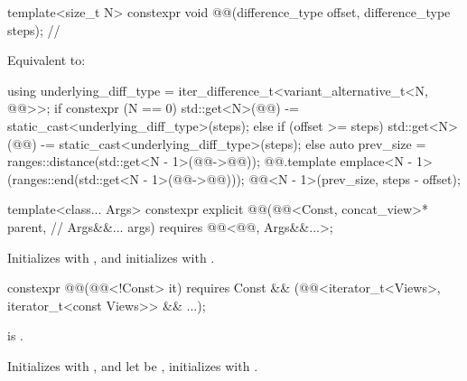 %
\begin{itemdecl}
template<size_t N>
  constexpr void @@(difference_type offset, difference_type steps);        // \expos
\end{itemdecl}

\begin{itemdescr}
\pnum
\effects
Equivalent to:
\begin{codeblock}
using underlying_diff_type = iter_difference_t<variant_alternative_t<N, @@>>;
if constexpr (N == 0) {
  std::get<N>(@@) -= static_cast<underlying_diff_type>(steps);
} else {
  if (offset >= steps) {
    std::get<N>(@@) -= static_cast<underlying_diff_type>(steps);
  } else {
    auto prev_size = ranges::distance(std::get<N - 1>(@@->@@));
    @@.template emplace<N - 1>(ranges::end(std::get<N - 1>(@@->@@)));
    @@<N - 1>(prev_size, steps - offset);
  }
}
\end{codeblock}
\end{itemdescr}

%
\begin{itemdecl}
template<class... Args>
  constexpr explicit @@(@@<Const, concat_view>* parent,          // \expos
                              Args&&... args)
    requires @@<@@, Args&&...>;
\end{itemdecl}

\begin{itemdescr}
\pnum
\effects
Initializes  with , and
initializes  with .
\end{itemdescr}

%
\begin{itemdecl}
constexpr @@(@@<!Const> it)
  requires Const &&
           (@@<iterator_t<Views>, iterator_t<const Views>> && ...);
\end{itemdecl}

\begin{itemdescr}
\pnum
\expects
{} is .

\pnum
\effects
Initializes  with , and
let  be ,
initializes  with
.
\end{itemdescr}

